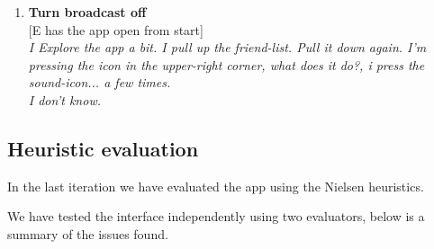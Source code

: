 \documentclass[runningheads,a4paper]{llncs}
\begin{document}
\begin{enumerate}
	\item \textbf{Turn broadcast off}\\
		{[}E has the app open from start{]}\\
		\textit{I Explore the app a bit. I pull up the friend-list. Pull it down again. I'm pressing the icon in the upper-right corner, what does it do?, i press the sound-icon... a few times. \\I don't know.}
		
\end{enumerate}

\subsection*{Heuristic evaluation} \label{heuristic}
In the last iteration we have evaluated the app using the Nielsen heuristics\cite{nielsenheuristics}.

We have tested the interface independently using two evaluators, below is a summary of the issues found.\\
\end{document}
